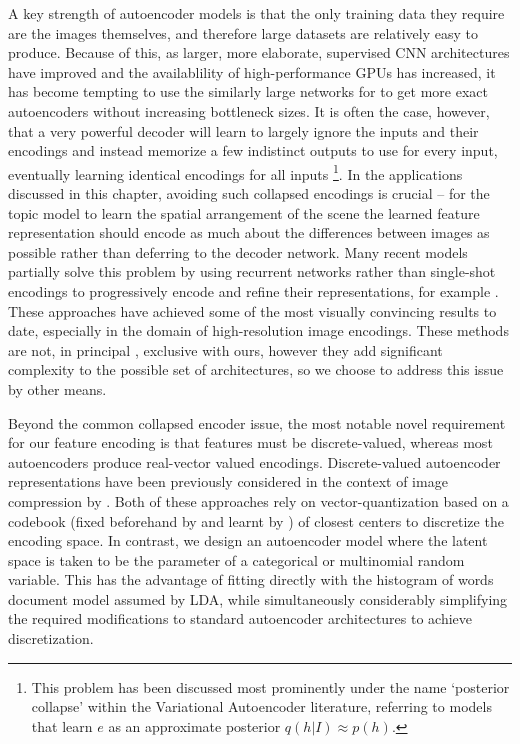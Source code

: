 A key strength of autoencoder models is that the only training data they require are the images themselves, and therefore large datasets are relatively easy to produce. Because of this, as larger, more elaborate, supervised CNN architectures have improved and the availablility of high-performance GPUs has increased, it has become tempting to use the similarly large networks for to get more exact autoencoders without increasing bottleneck sizes. It is often the case, however, that a very powerful decoder will learn to largely ignore the inputs and their encodings and instead memorize a few indistinct outputs to use for every input, eventually learning identical encodings for all inputs \citep{vincent2010stacked,Chen2016}\footnote{This problem has been discussed most prominently under the name `posterior collapse' within the Variational Autoencoder literature, referring to models that learn $e$ as an approximate posterior $q(h | I) \approx p(h)$.}. In the applications discussed in this chapter, avoiding such collapsed encodings is crucial -- for the topic model to learn the spatial arrangement of the scene the learned feature representation should encode as much about the differences between images as possible rather than deferring to the decoder network. Many recent models partially solve this problem by using recurrent networks rather than single-shot encodings to progressively encode and refine their representations, for example \citep{OordPixelCNN,Chen2016,Gregor2016}. These approaches have achieved some of the most visually convincing results to date, especially in the domain of high-resolution image encodings. These methods are not, in principal , exclusive with ours, however they add significant complexity to the possible set of architectures, so we choose to address this issue by other means.

Beyond the common collapsed encoder issue, the most notable novel requirement for our feature encoding is that features must be discrete-valued, whereas most autoencoders produce real-vector valued encodings. Discrete-valued autoencoder representations have been previously considered in the context of image compression by \citep{AgustssonSoftToHardVQ,vqvae2017}. Both of these approaches rely on vector-quantization based on a codebook (fixed beforehand by \citep{AgustssonSoftToHardVQ} and learnt by \citep{vqvae2017}) of closest centers to discretize the encoding space. 
In contrast, we design an autoencoder model where the latent space is taken to be the parameter of a categorical or multinomial random variable. This has the advantage of fitting directly with the histogram of words document model assumed by LDA, while simultaneously considerably simplifying the required modifications to standard autoencoder architectures to achieve discretization.

